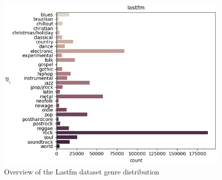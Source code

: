 \begin{figure}[!htb]
    \centering
    \includegraphics[width=1.0\textwidth]{Figures/lastfm_dist.png}
    \decoRule
    \caption[Lastfm distribution]{Overview of the Lastfm dataset genre distribution}
    \label{fig:lastfmdistfig}
\end{figure}
